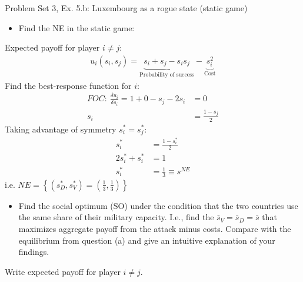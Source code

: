 \begin{frame}{Problem Set 3, Ex. 5.b: Luxembourg as a rogue state (static game)}
  \begin{multicols}{2}
    \begin{itemize}
      \item[(a)] Find the NE in the static game:
    \end{itemize}
    Expected payoff for player $i\neq j$:
    \begin{align*}
      u_i(s_i,s_j)=\underbrace{s_i+s_j-s_is_j}_\text{Probability of success}-\underbrace{s_i^2}_\text{Cost}
    \end{align*}
    Find the best-response function for $i$:
    \begin{align*}
      FOC:\ \frac{\delta u_i}{\delta s_i}=1+0-s_j-2s_i&=0\\
       s_i&=\frac{1-s_j}{2}
    \end{align*}
    Taking advantage of symmetry $s_i^{*}=s_j^{*}$:
    \begin{align*}
       s_i^{*}&=\frac{1-s_i^{*}}{2}\\
      2s_i^{*}+s_i^{*}&=1\\
       s_i^{*}&=\frac{1}{3}\equiv s^{NE}
    \end{align*}
    i.e. $NE=\left\{(s_D^{*},s_V^{*})=(\frac{1}{3},\frac{1}{3})\right\}$
  \vfill\null\columnbreak
    \begin{itemize}
      \item[(b)] Find the social optimum (SO) under the condition that the two countries use the same share of their military capacity. I.e., find the $\bar{s}_V=\bar{s}_D=\bar{s}$ that maximizes aggregate payoff from the attack minus costs. Compare with the equilibrium from question (a) and give an intuitive explanation of your findings.
    \end{itemize}
    Write expected payoff for player $i\neq j$.
  \vfill\null
  \end{multicols}
\end{frame}

